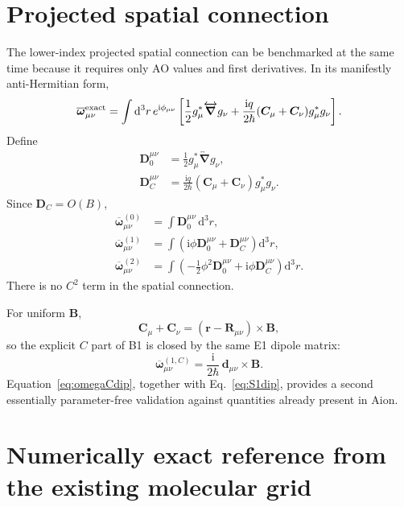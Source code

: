 \documentclass[11pt]{article}
\newcommand{\ii}{\mathrm{i}}
\newcommand{\dd}{\mathrm{d}}
\newcommand{\vect}[1]{\bm{#1}}
\begin{document}
\section{Projected spatial connection}

The lower-index projected spatial connection can be benchmarked at the same time because it requires only AO values and first derivatives.  In its manifestly anti-Hermitian form,
\begin{equation}
\overline{\vect\omega}_{\mu\nu}^{\rm exact}
=\int \dd^3r\,e^{\ii\phi_{\mu\nu}}
\left[
\frac12 g_\mu^*\overleftrightarrow{\vect\nabla}g_\nu
+\frac{\ii q}{2\hbar}
(\vect C_\mu+\vect C_\nu)g_\mu^*g_\nu
\right].
\label{eq:omegaexact}
\end{equation}
Define
\begin{align}
\vect D_0^{\mu\nu}
&=\frac12 g_\mu^*\overleftrightarrow{\vect\nabla}g_\nu,\\
\vect D_C^{\mu\nu}
&=\frac{\ii q}{2\hbar}(\vect C_\mu+\vect C_\nu)g_\mu^*g_\nu.
\end{align}
Since $\vect D_C=O(B)$,
\begin{align}
\overline{\vect\omega}^{(0)}_{\mu\nu}
&=\int \vect D_0^{\mu\nu}\,\dd^3r,\\
\overline{\vect\omega}^{(1)}_{\mu\nu}
&=\int\left(\ii\phi\vect D_0^{\mu\nu}+\vect D_C^{\mu\nu}\right)\dd^3r,\\
\overline{\vect\omega}^{(2)}_{\mu\nu}
&=\int\left(-\frac12\phi^2\vect D_0^{\mu\nu}
+\ii\phi\vect D_C^{\mu\nu}\right)\dd^3r.
\end{align}
There is no $C^2$ term in the spatial connection.

For uniform $\vect B$,
\begin{equation}
\vect C_\mu+\vect C_\nu
=(\vect r-\vect R_{\mu\nu})\times\vect B,
\end{equation}
so the explicit $C$ part of B1 is closed by the same E1 dipole matrix:
\begin{equation}
\boxed{
\overline{\vect\omega}^{(1,C)}_{\mu\nu}
=\frac{\ii}{2\hbar}\,
\vect d_{\mu\nu}\times\vect B.}
\label{eq:omegaCdip}
\end{equation}
Equation~\eqref{eq:omegaCdip}, together with Eq.~\eqref{eq:S1dip}, provides a second essentially parameter-free validation against quantities already present in Aion.

\section{Numerically exact reference from the existing molecular grid}
\end{document}
